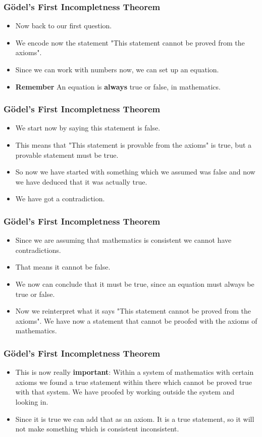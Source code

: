 \documentclass[aspectratio=169]{beamer}
\begin{document}
\begin{frame}
	\frametitle{Gödel's First Incompletness Theorem}
	\begin{itemize}
		\item Now back to our first question.
		\item We encode now the statement "This statement cannot be proved from the axioms".
		\item Since we can work with numbers now, we can set up an equation.
		\item \textbf{Remember} An equation is \textbf{always} true or false, in mathematics.
	\end{itemize}
\end{frame}

\begin{frame}
	\frametitle{Gödel's First Incompletness Theorem}
	\begin{itemize}
		\item We start now by saying this statement is false. 
		\item This means that "This statement is provable from the axioms" is true, but a provable statement must be true.
		\item So now we have started with something which we assumed was false and now we have deduced that it was actually true. 
		\item We have got a contradiction.
	\end{itemize}
\end{frame}

\begin{frame}
	\frametitle{Gödel's First Incompletness Theorem}
	\begin{itemize}
		\item Since we are assuming that mathematics is consistent we cannot have contradictions.
		\item That means it cannot be false. 
		\item We now can conclude that it must be true, since an equation must always be true or false.
		\item Now we reinterpret what it says "This statement cannot be proved from the axioms". We have now a statement that cannot be proofed with the axioms of mathematics.
	\end{itemize}
\end{frame}

\begin{frame}
	\frametitle{Gödel's First Incompletness Theorem}
	\begin{itemize}
		\item This is now really \textbf{important}: Within a system of mathematics with certain axioms we found a true statement within there which cannot be proved true with that system. We have proofed by working outside the system and looking in. \label{important}
		\item Since it is true we can add that as an axiom. It is a true statement, so it will not make something which is consistent inconsistent.
	\end{itemize}
\end{frame}
\end{document}
